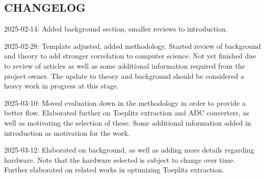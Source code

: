 \subsection{CHANGELOG}\label{changelog}

2025-02-14: Added background section, smaller reviews to introduction.

2025-02-28: Template adjusted, added methodology. Started review of background and theory to add stronger correlation to computer science. Not yet finished due to review of articles as well as some additional information required from the project owner. The update to theory and background should be considered a heavy work in progress at this stage.

2025-03-10: Moved evaluation down in the methodology in order to provide a better flow. Elaborated further on Toeplitz extraction and ADC converters, as well as motivating the selection of these. Some additional information added in introduction as motivation for the work.

2025-03-12: Elaborated on background, as well as adding more details regarding hardware. Note that the hardware selected is subject to change over time. Further elaborated on related works in optimizing Toeplitz extraction.
